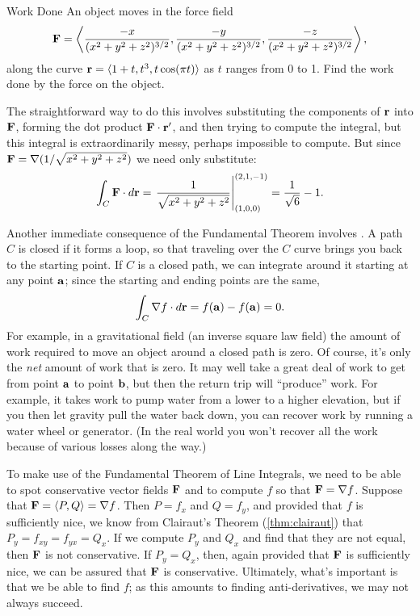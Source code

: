 \begin{example}{Work Done}{}
An object moves in the force field 
$${\bf F}=
\left
\langle {-x\over (x^2+y^2+z^2)^{3/2}},{-y\over (x^2+y^2+z^2)^{3/2}},{-z\over
  (x^2+y^2+z^2)^{3/2}}\right\rangle,$$
along the curve ${\bf r}=\langle 1+t,t^3,t\cos(\pi t)\rangle$ as $t$
ranges from 0 to 1. Find the work done by the force on the object.
\end{example}
\begin{solution}
The straightforward way to do this involves substituting the
components of ${\bf r}$ into $\bf F$, forming the dot product ${\bf
  F}\cdot{\bf r}'$, and then trying to compute the integral, but this
integral is extraordinarily messy, perhaps impossible to compute. But
since ${\bf F}=\nabla (1/\sqrt{x^2+y^2+z^2})$ we need only substitute:
$$\int_C {\bf F}\cdot d{\bf r}=
\left.{1\over \sqrt{x^2+y^2+z^2}}\right|_{(1,0,0)}^{(2,1,-1)}=
{1\over\sqrt6}-1.
$$
\end{solution}

Another immediate consequence of the Fundamental Theorem involves
. A path $C$ is closed if it
forms a loop, so that traveling over the $C$ curve brings you back to
the starting point. If $C$ is a closed path, we can integrate around
it starting at any point $\bf a$; since the starting and ending points are the
same,
$$\int_C \nabla f\cdot d{\bf r}=f({\bf a})-f({\bf a})=0.$$
For example, in a gravitational field (an inverse square law field)
the amount of work required to move an object around a closed path is
zero. Of course, it's only the \emph{net} amount of work that is
zero. It may well take a great deal of work to get from point $\bf a$
to point $\bf b$, but then the return trip will ``produce'' work. For
example, it takes work to pump water from a lower to a higher elevation,
but if you then let gravity pull the water back down, you can recover
work by running a water wheel or generator. (In the real world you
won't recover all the work because of various losses along the way.)

To make use of the Fundamental Theorem of Line Integrals, we need to
be able to spot conservative vector fields $\bf F$ and to compute 
$f$ so that ${\bf F}=\nabla f$. Suppose that ${\bf F}=\langle
P,Q\rangle = \nabla f$. Then $P=f_x$ and $Q=f_y$, and provided that
$f$ is sufficiently nice, we know from Clairaut's Theorem
(\ref{thm:clairaut}) that $P_y=f_{xy}=f_{yx}=Q_x$. If we compute
$P_y$ and $Q_x$ and find that they are not equal, then $\bf F$ is not
conservative. If $P_y=Q_x$, then, again provided that $\bf F$ is
sufficiently nice, we can be assured that $\bf F$ is conservative.
Ultimately, what's important is that we be able to find $f$; as this
amounts to finding anti-derivatives, we may not always succeed.

